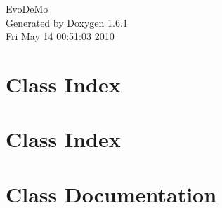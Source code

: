\documentclass[a4paper]{book}
\begin{document}
\hypersetup{pageanchor=false}
\begin{titlepage}
\vspace*{7cm}
\begin{center}
{\Large EvoDeMo }\\
\vspace*{1cm}
{\large Generated by Doxygen 1.6.1}\\
\vspace*{0.5cm}
{\small Fri May 14 00:51:03 2010}\\
\end{center}
\end{titlepage}
\clearemptydoublepage
{}
\tableofcontents
\clearemptydoublepage
{}
\hypersetup{pageanchor=true}
\chapter{Class Index}

\chapter{Class Index}

\chapter{Class Documentation}











































\printindex
\end{document}
